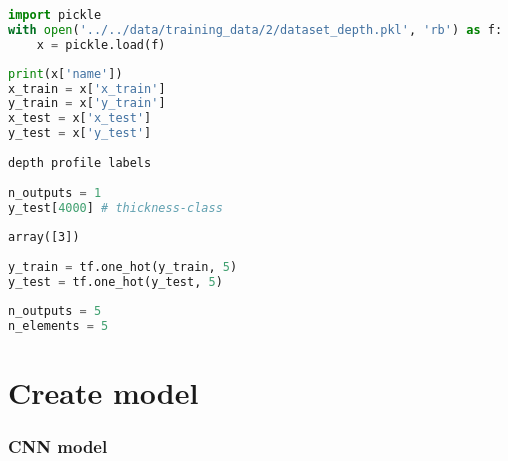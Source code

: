 \begin{lstlisting}[language=Python]
import pickle
with open('../../data/training_data/2/dataset_depth.pkl', 'rb') as f:
    x = pickle.load(f)
\end{lstlisting}

\begin{lstlisting}[language=Python]
print(x['name'])
x_train = x['x_train']
y_train = x['y_train']
x_test = x['x_test']
y_test = x['y_test']
\end{lstlisting}

\begin{lstlisting}
depth profile labels
\end{lstlisting}

\begin{lstlisting}[language=Python]
n_outputs = 1
y_test[4000] # thickness-class
\end{lstlisting}

\begin{lstlisting}
array([3])
\end{lstlisting}

\begin{lstlisting}[language=Python]
y_train = tf.one_hot(y_train, 5)
y_test = tf.one_hot(y_test, 5)
\end{lstlisting}

\begin{lstlisting}[language=Python]
n_outputs = 5
n_elements = 5
\end{lstlisting}

\hypertarget{create-model}{%
\section{Create model}\label{create-model}}

\hypertarget{cnn-model}{%
\subsubsection{CNN model}\label{cnn-model}}

